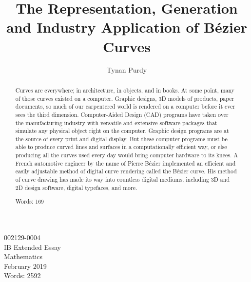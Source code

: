 \documentclass[12pt,letterpaper]{article}
\title{The Representation, Generation and Industry Application of B\'ezier Curves}
\author{Tynan Purdy}
\date{\vspace{-5ex}}
\begin{document}
\large
\parindent=0.5in
{\fontsize{12}{14.4}
	{\singlespace
	    \maketitle
	    \begin{center}
	    \vspace{4mm}
	    002129-0004 \\
	    \vspace{4mm}
	    IB Extended Essay \\
	    \vspace{4mm}
	    Mathematics \\
	    \vspace{4mm}
	    February 2019 \\
	    \vspace{4mm}
	    Words: 2592 \\
	\end{center}
	}
}	

\newpage
{}
\begin{abstract}
Curves are everywhere; in architecture, in objects, and in books. At some point, many of those curves existed on a computer. Graphic designs, 3D models of products, paper documents, so much of our carpentered world is rendered on a computer before it ever sees the third dimension. Computer-Aided Design (CAD) programs have taken over the manufacturing industry with versatile and extensive software packages that simulate any physical object right on the computer. Graphic design programs are at the source of every print and digital display. But these computer programs must be able to produce curved lines and surfaces in a computationally efficient way, or else producing all the curves used every day would bring computer hardware to its knees. A French automotive engineer by the name of Pierre B\'ezier implemented an efficient and easily adjustable method of digital curve rendering called the B\'ezier curve. His method of curve drawing has made its way into countless digital mediums, including 3D and 2D design software, digital typefaces, and more.

Words: 169

\end{abstract}

\newpage
\tableofcontents

\newpage
\end{document}
